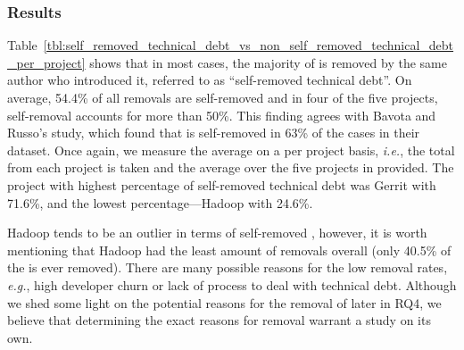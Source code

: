 \subsubsection*{Results} Table~\ref{tbl:self_removed_technical_debt_vs_non_self_removed_technical_debt_per_project} shows that in most cases, the majority of \SATD is removed by the same author who introduced it, referred to as ``self-removed technical debt''. On average, 54.4\% of all removals are self-removed and in four of the five projects, self-removal accounts for more than 50\%.  This finding agrees with Bavota and Russo's study, which found that \SATD is self-removed in 63\% of the cases in their dataset. Once again, we measure the average on a per project basis, \emph{i.e.}, the total from each project is taken and the average over the five projects in provided. The project with highest percentage of self-removed technical debt was Gerrit with 71.6\%, and the lowest percentage---Hadoop with 24.6\%. 

Hadoop tends to be an outlier in terms of self-removed \SATD, however, it is worth mentioning that Hadoop had the least amount of removals overall (only 40.5\% of the \SATD is ever removed). There are many possible reasons for the low removal rates, \emph{e.g.}, high developer churn or lack of process to deal with technical debt. Although we shed some light on the potential reasons for the removal of \SATD later in RQ4, we believe that determining the exact reasons for \SATD removal warrant a study on its own.




